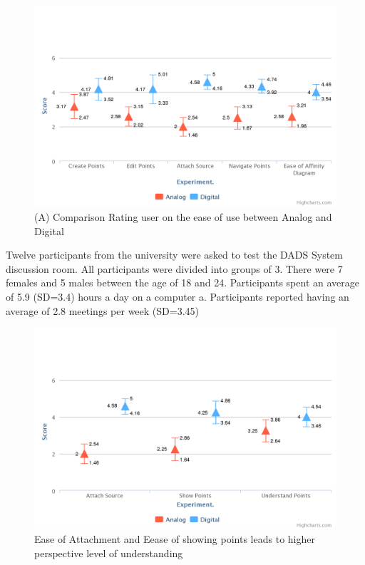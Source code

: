 \documentclass{sigchi}
\begin{document}
\begin{itemize}
\begin{itemize}
\begin{figure}[!h]
\centering
\includegraphics[width=1.1\columnwidth]{basicchart}
\caption{(A) Comparison Rating user on the ease of use between Analog and Digital}
\label{fig:figure1}
\end{figure}



 Twelve  participants from the university  were asked to test the DADS System discussion room. All participants were divided into groups of 3. There were 7 females and 5 males between the age of 18 and 24.  Participants spent an average of 5.9 (SD=3.4) hours a day on a computer a. Participants reported having an average of 2.8 meetings per week (SD=3.45)



\begin{figure}[!h]
\centering
\includegraphics[width=1.1\columnwidth]{attach}
\caption{Ease of Attachment and Eease of showing points leads to higher perspective level of understanding}
\label{fig:figure1}
\end{figure}




\end{itemize}
\end{itemize}
\end{document}
